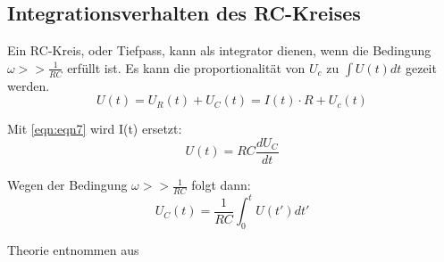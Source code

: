\label{sec:Theorie}



\subsection{Integrationsverhalten des RC-Kreises}
Ein RC-Kreis, oder Tiefpass, kann als integrator dienen, wenn die Bedingung $\omega >> \frac{1}{RC}$ erfüllt ist. Es kann die proportionalität von $U_c$ zu $\int U(t) dt$ gezeit werden.
\begin{equation}
    U(t) = U_{R}(t) + U_C(t) = I(t) \cdot R + U_c(t)
    \label{eq:e9} %
\end{equation}

Mit \ref{eqn:eqn7} wird I(t) ersetzt:\\

\begin{equation}
    U(t) = RC\frac{dU_C}{dt}
    \label{eq:e10} %
\end{equation}

Wegen der Bedingung $\omega >> \frac{1}{RC}$ folgt dann:
\begin{equation}
    U_C(t) = \frac{1}{RC}\int_{0}^{t}U(t') dt'
    \label{eq:e11} %
\end{equation}



 Theorie entnommen aus \cite{V353}
